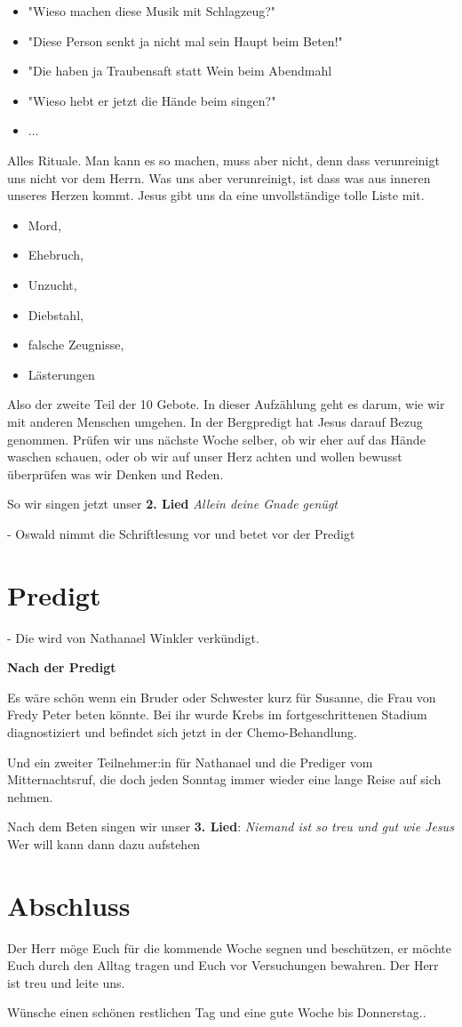 \documentclass{../inc/mybib}
\begin{document}
\begin{itemize}
    \item "Wieso machen diese Musik mit Schlagzeug?" 
    \item "Diese Person senkt ja nicht mal sein Haupt beim Beten!"
    \item "Die haben ja Traubensaft statt Wein beim Abendmahl
    \item "Wieso hebt er jetzt die Hände beim singen?"
    \item ...
\end{itemize}
Alles Rituale. Man kann es so machen, muss aber nicht, denn dass verunreinigt uns nicht vor dem Herrn. 
Was uns aber verunreinigt, ist dass was aus inneren unseres Herzen kommt. Jesus gibt uns da eine unvollständige tolle Liste mit.
\begin{itemize}
    \item Mord, 
    \item Ehebruch, 
    \item Unzucht, 
    \item Diebstahl, 
    \item falsche Zeugnisse, 
    \item Lästerungen
\end{itemize}
Also der zweite Teil der 10 Gebote. In dieser Aufzählung geht es darum, wie wir mit anderen Menschen umgehen. In der Bergpredigt hat Jesus darauf Bezug genommen. Prüfen wir uns nächste Woche selber, ob wir eher auf das Hände waschen schauen, oder ob wir auf unser Herz achten und wollen bewusst überprüfen was wir Denken und Reden.

So wir singen jetzt unser \textbf{2. Lied} \textit{Allein deine Gnade genügt}

- Oswald nimmt die Schriftlesung vor und betet vor der Predigt

\section{Predigt}
- Die wird von Nathanael Winkler verkündigt.

\textbf{Nach der Predigt}

Es wäre schön wenn ein Bruder oder Schwester kurz für Susanne, die Frau von Fredy Peter beten könnte. 
Bei ihr wurde Krebs im fortgeschrittenen Stadium diagnostiziert und befindet sich jetzt in der Chemo-Behandlung.

Und ein zweiter Teilnehmer:in für Nathanael und die Prediger vom Mitternachtsruf, die doch jeden Sonntag immer wieder eine lange Reise auf sich nehmen.

Nach dem Beten singen wir unser \textbf{3. Lied}: \textit{Niemand ist so treu und gut wie Jesus}
Wer will kann dann dazu aufstehen

\section{Abschluss}

Der Herr möge Euch für die kommende Woche segnen und beschützen, er möchte Euch durch den Alltag tragen und Euch vor Versuchungen bewahren. Der Herr ist treu und leite uns.

Wünsche einen schönen restlichen Tag und eine gute Woche bis Donnerstag..
\end{document}
